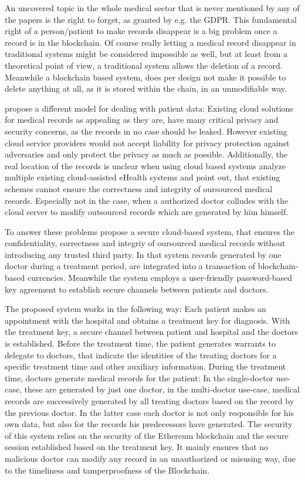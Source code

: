 An uncovered topic in the whole medical sector that is never mentioned by any of the papers is the right to forget, as granted by e.g. the GDPR. This fundamental right of a person/patient to make records disappear is a big problem once a record is in the blockchain. Of course really letting a medical record disappear in traditional systems might be considered impossible as well, but at least from a theoretical point of view, a traditional system allows the deletion of a record. Meanwhile a blockchain based system, does per design not make it possible to delete anything at all, as it is stored within the chain, in an unmodifiable way.

\citeauthor{Cao2019} propose a different model for dealing with patient data:
Existing cloud solutions for medical records as appealing as they are, have many critical privacy and security concerns, as the records in no case should be leaked. However existing cloud service providers would not accept liability for privacy protection against adversaries and only protect the privacy as much as possible. Additionally, the real location of the records is unclear when using cloud based systems 
\citeauthor{Cao2019} analyze multiple existing cloud-assisted eHealth systems and point out, that existing schemes cannot ensure the correctness and integrity of oursourced medical records. Especially not in the case, when a authorized doctor colludes with the cloud server to modify outsourced records which are generated by him himself.

To answer these problems \citeauthor{Cao2019} propose a secure cloud-based system, that ensures the confidentiality, correctness and integriy of oursourced medical records without introducing any trusted third party. In that system records generated by one doctor during a treatment period, are integrated into a transaction of blockchain-based currencies. Meanwhile the system employs a user-friendly password-based key agreement to establish secure channels between patients and doctors.

The proposed system works in the following way: Each patient makes an appointment with the hospital and obtains a treatment key for diagnosis. With the treatment key, a secure channel between patient and hospital and the doctors is established. 
Before the treatment time, the patient generates warrants to delegate to doctors, that indicate the identities of the treating doctors for a specific treatment time and other auxiliary information.
During the treatment time, doctors generate medical records for the patient: In the single-doctor use-case, these are generated by just one doctor, in the multi-doctor use-case, medical records are successively generated by all treating doctors based on the record by the previous doctor. In the latter case each doctor is not only responsible for his own data, but also for the records his predecessors have generated.
The security of this system relies on the security of the Ethereum blockchain and the secure session established based on the treatment key. It mainly ensures that no malicious doctor can modify any record in an unauthorized or misusing way, due to the timeliness and tamperproofness of the Blockchain.

